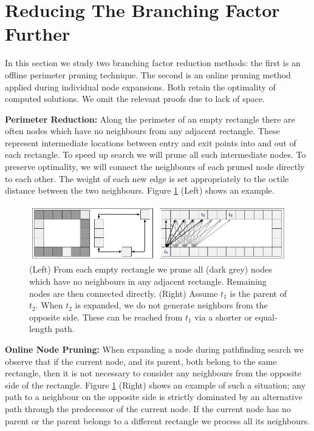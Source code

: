 \section{Reducing The Branching Factor Further}
In this section we study two branching factor reduction methods: the first
is an offline perimeter pruning technique. The second is an online pruning
method applied during individual node expansions.
Both retain the optimality of computed solutions. We omit the
relevant proofs due to lack of space.

\noindent
\textbf{Perimeter Reduction:}
Along the perimeter of an empty rectangle there are often nodes
which have no neighbours from any adjacent rectangle.  
These represent intermediate locations between entry and exit points into and
out of each rectangle.
To speed up search we will prune all such intermediate nodes.
To preserve optimality, we will
connect the neighbours of each pruned node directly to each other.  The weight
of each new edge is set appropriately to the octile distance between the two
neighbours.  Figure \ref{fig-branching} (Left) shows an example.  

\begin{figure}[t]
	\begin{center}
	\includegraphics[width=0.97\columnwidth, trim = 10mm 10mm 10mm 0mm]
	{diagrams/branching_wide.png}
	\end{center}
	\vspace{-3pt}
	\caption{(Left) From each empty rectangle we prune all (dark grey) nodes which
	have no neighbours in any adjacent rectangle.
	Remaining nodes are then connected directly.
	(Right) Assume $t_{1}$ is the parent of $t_2$. When $t_2$
	is expanded, we do not generate neighbors from the opposite side.
	These can be reached from $t_1$ via a shorter or equal-length path.
}
\label{fig-branching}
\end{figure}

\noindent
\textbf{Online Node Pruning:}
When expanding a node during pathfinding search we observe that if the current
node, and its parent, both belong to the same rectangle, then it is not
necessary to consider any neighbours from the opposite side of the rectangle.
Figure \ref{fig-branching} (Right) shows an example of such a situation; any
path to a neighbour on the opposite side is strictly dominated by an alternative
path through the predecessor of the current node.  If the current node has no
parent or the parent belongs to a different rectangle we process all its
neighbours.
